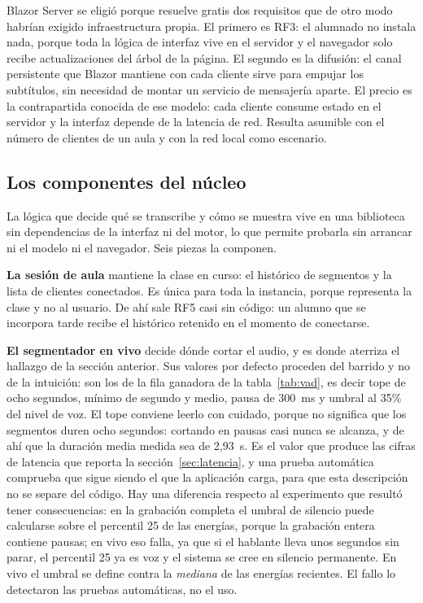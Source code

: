 Blazor Server se eligió porque resuelve gratis dos requisitos que de otro modo habrían
exigido infraestructura propia. El primero es RF3: el alumnado no instala nada, porque toda
la lógica de interfaz vive en el servidor y el navegador solo recibe actualizaciones del
árbol de la página. El segundo es la difusión: el canal persistente que Blazor mantiene con
cada cliente sirve para empujar los subtítulos, sin necesidad de montar un servicio de
mensajería aparte. El precio es la contrapartida conocida de ese modelo: cada cliente
consume estado en el servidor y la interfaz depende de la latencia de red. Resulta asumible
con el número de clientes de un aula y con la red local como escenario.

\subsection{Los componentes del núcleo}

La lógica que decide qué se transcribe y cómo se muestra vive en una biblioteca sin
dependencias de la interfaz ni del motor, lo que permite probarla sin arrancar ni el modelo
ni el navegador. Seis piezas la componen.

\textbf{La sesión de aula} mantiene la clase en curso: el histórico de segmentos y la lista
de clientes conectados. Es única para toda la instancia, porque representa la clase y no al
usuario. De ahí sale RF5 casi sin código: un alumno que se incorpora tarde recibe el
histórico retenido en el momento de conectarse.

\textbf{El segmentador en vivo} decide dónde cortar el audio, y es donde aterriza el
hallazgo de la sección anterior. Sus valores por defecto proceden del barrido y no de la
intuición: son los de la fila ganadora de la tabla~\ref{tab:vad}, es decir tope de ocho
segundos, mínimo de segundo y medio, pausa de 300~ms y umbral al 35\% del nivel de voz. El
tope conviene leerlo con cuidado, porque no significa que los segmentos duren ocho
segundos: cortando en pausas casi nunca se alcanza, y de ahí que la duración media medida
sea de 2,93~s. Es el valor que produce las cifras de latencia que reporta la
sección~\ref{sec:latencia}, y una prueba automática comprueba que sigue siendo el que la
aplicación carga, para que esta descripción no se separe del código. Hay una diferencia
respecto al experimento que resultó tener consecuencias:
en la grabación completa el umbral de silencio puede calcularse sobre el percentil 25 de las
energías, porque la grabación entera contiene pausas; en vivo eso falla, ya que si el
hablante lleva unos segundos sin parar, el percentil 25 ya es voz y el sistema se cree en
silencio permanente. En vivo el umbral se define contra la \emph{mediana} de las energías
recientes. El fallo lo detectaron las pruebas automáticas, no el uso.

